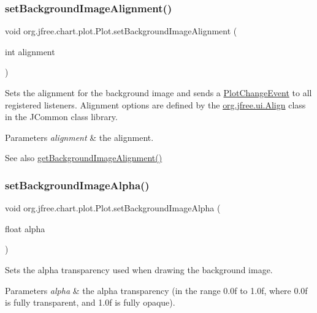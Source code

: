 \subsubsection{\texorpdfstring{set\+Background\+Image\+Alignment()}{setBackgroundImageAlignment()}}
{\footnotesize\ttfamily void org.\+jfree.\+chart.\+plot.\+Plot.\+set\+Background\+Image\+Alignment (\begin{DoxyParamCaption}\item[{int}]{alignment }\end{DoxyParamCaption})}

Sets the alignment for the background image and sends a \mbox{\hyperlink{}{Plot\+Change\+Event}} to all registered listeners. Alignment options are defined by the \mbox{\hyperlink{}{org.\+jfree.\+ui.\+Align}} class in the J\+Common class library.


\begin{DoxyParams}{Parameters}
{\em alignment} & the alignment.\\
\hline
\end{DoxyParams}
\begin{DoxySeeAlso}{See also}
\mbox{\hyperlink{classorg_1_1jfree_1_1chart_1_1plot_1_1_plot_ae0d72cd3dcbd9d4aad47d98d00a976ce}{get\+Background\+Image\+Alignment()}} 
\end{DoxySeeAlso}
\mbox{\label{classorg_1_1jfree_1_1chart_1_1plot_1_1_plot_a054791107eb3a070dec492dbd1901b04}} 
\subsubsection{\texorpdfstring{set\+Background\+Image\+Alpha()}{setBackgroundImageAlpha()}}
{\footnotesize\ttfamily void org.\+jfree.\+chart.\+plot.\+Plot.\+set\+Background\+Image\+Alpha (\begin{DoxyParamCaption}\item[{float}]{alpha }\end{DoxyParamCaption})}

Sets the alpha transparency used when drawing the background image.


\begin{DoxyParams}{Parameters}
{\em alpha} & the alpha transparency (in the range 0.\+0f to 1.\+0f, where 0.\+0f is fully transparent, and 1.\+0f is fully opaque).\\
\hline
\end{DoxyParams}

